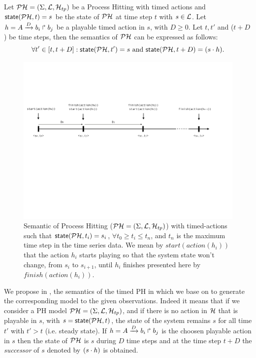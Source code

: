 \begin{definition}
\label{def:semantic}
Let $\mathcal{PH} = (\Sigma,\mathcal{L},\mathcal{H}_{tp})$ be a Process Hitting with timed actions and $\textsf{state}(\mathcal{PH}, t)=s$ be the state of $\mathcal{PH}$ at time step $t$ with $s \in \mathcal{L}$. Let $h = A\xrightarrow{D} b_i \Rsh b_j$ be a playable timed action in $s$, with $D \geq 0 $.
Let $t, t'$ and ($t+D$) be time steps, then the semantics of $\mathcal{PH}$ can be expressed as follows:
$$ \forall t' \in [t, t+D ] : \textsf{state}(\mathcal{PH}, t')=s \text{ and } \textsf{state}(\mathcal{PH}, t+D)=(s \cdot h).$$
\end{definition}

\begin{figure}
\includegraphics[width=1\linewidth]{images/semantic-timed-PH}
\caption{Semantic of Process Hitting ($\mathcal{PH} = (\Sigma,\mathcal{L},\mathcal{H}_{tp})$) with timed-actions such that $\textsf{state}(\mathcal{PH}, t_i)=s_i$, $ \forall t_0 \geq t_i \leq t_n$, and $t_n$ is the maximum time step in the time series data. We mean by $start(action(h_i))$ that the action $h_i$ starts playing so that the system state won't change, from $s_i$ to $s_{i+1}$, until $h_i$ finishes presented here by $finish(action(h_i))$.}
\end{figure}

We propose in , the semantics of the timed PH in which we base on to generate the corresponding model to the given observations. Indeed it means that if we consider a PH model $\mathcal{PH} = (\Sigma,\mathcal{L},\mathcal{H}_{tp})$, and if there is no action in $\mathcal{H}$ that is playable in $s$, with $s=\textsf{state}(\mathcal{PH}, t)$, the state of the system remains $s$ for all time $t'$ with $t' > t$ (i.e. steady state). If $h = A\xrightarrow{D} b_i \Rsh b_j$ is the choosen playable action in $s$ then the state of $\mathcal{PH}$ is $s$ during $D$ time steps and at the time step $t+D$
the \emph{successor} of $s$ denoted by $(s \cdot h)$ is obtained.
\\


